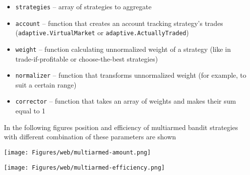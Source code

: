 \documentclass[a4paper,11pt]{article}
\begin{document}
\begin{itemize}
\itemsep1pt\parskip0pt
\item
  \texttt{strategies} -- array of strategies to aggregate
\item
  \texttt{account} -- function that creates an account tracking
  strategy's trades (\texttt{adaptive.VirtualMarket} or
  \texttt{adaptive.ActuallyTraded})
\item
  \texttt{weight} -- function calculating unnormalized weight of a
  strategy (like in trade-if-profitable or choose-the-best strategies)
\item
  \texttt{normalizer} -- function that transforms unnormalized weight
  (for example, to suit a certain range)
\item
  \texttt{corrector} -- function that takes an array of weights and
  makes their sum equal to 1
\end{itemize}

In the following figures position and efficiency of multiarmed bandit
strategies with different combination of these parameters are shown

\centerline{\texttt{[image: Figures/web/multiarmed-amount.png]}}

\centerline{\texttt{[image: Figures/web/multiarmed-efficiency.png]}}
\end{document}
